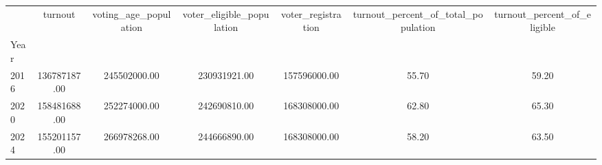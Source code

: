 \begin{tabular}{lcccccc}
\toprule
 & turnout & voting_age_population & voter_eligible_population & voter_registration & turnout_percent_of_total_population & turnout_percent_of_eligible \\
Year &  &  &  &  &  &  \\
\midrule
2016 & 136787187.00 & 245502000.00 & 230931921.00 & 157596000.00 & 55.70 & 59.20 \\
2020 & 158481688.00 & 252274000.00 & 242690810.00 & 168308000.00 & 62.80 & 65.30 \\
2024 & 155201157.00 & 266978268.00 & 244666890.00 & 168308000.00 & 58.20 & 63.50 \\
\bottomrule
\end{tabular}
